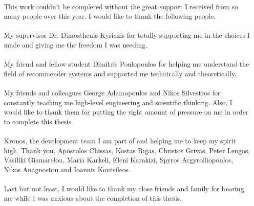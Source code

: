 \documentclass[10pt,journal]{IEEEtran}
\begin{document}
	\paragraph{} This work couldn't be completed without the great support I received from so many people over this year. I would like to thank the following people.
	
	\paragraph{} My supervisor Dr. Dimosthenis Kyriazis for totally supporting me in the choices I made and giving me the freedom I was needing.
	
	\paragraph{} My friend and fellow student Dimitris Poulopoulos for helping me understand the field of recommender systems and supported me technically and theoretically.
	
	\paragraph{} My friends and colleagues George Adamopoulos and Nikos Silvestros for constantly teaching me high-level engineering and scientific thinking. Also, I would like to thank them for putting the right amount of pressure on me in order to complete this thesis.
	
	\paragraph{} Kronos, the development team I am part of and helping me to keep my spirit high. Thank you, Apostolos Chissas, Kostas Rigas, Christos Grivas, Peter Lengos, Vasiliki Giamarelou, Maria Karkeli, Eleni Karakizi, Spyros Argyroiliopoulos, Nikos Anagnostou and Ioannis Koutsileos. 
	
	\paragraph{} Last but not least, I would like to thank my close friends and family for bearing me while I was anxious about the completion of this thesis.
	
	
	
\end{document}
